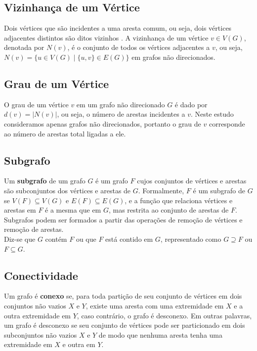 \subsection{Vizinhança de um Vértice}
Dois vértices que são incidentes a uma aresta comum, ou seja, dois vértices adjacentes distintos são ditos vizinhos \cite{Bondy2008}. A vizinhança de um vértice $v \in V(G)$, denotada por $N(v)$, é o conjunto de todos os vértices adjacentes a $v$, ou seja, $N(v) = \{ u \in V(G) \mid \{u, v\} \in E(G) \}$ em grafos não direcionados.

\subsection{Grau de um Vértice}
O grau de um vértice $v$ em um grafo não direcionado $G$ é dado por $d(v) = |N(v)|$, ou seja, o número de arestas incidentes a $v$. Neste estudo consideramos apenas grafos não direcionados, portanto o grau de $v$ corresponde ao número de arestas total ligadas a ele.

\subsection{Subgrafo}
Um \textbf{subgrafo} de um grafo $G$ é um grafo $F$ cujos conjuntos de vértices e arestas são subconjuntos dos vértices e arestas de $G$. Formalmente, $F$ é um subgrafo de $G$ se $V(F) \subseteq V(G)$ e $E(F) \subseteq E(G)$, e a função que relaciona vértices e arestas em $F$ é a mesma que em $G$, mas restrita ao conjunto de arestas de $F$. Subgrafos podem ser formados a partir das operações de remoção de vértices e remoção de arestas.\\
Diz-se que $G$ contém $F$ ou que $F$ está contido em $G$, representado como $G \supseteq F$ ou $F \subseteq G$.

\subsection{Conectividade}
Um grafo é \textbf{conexo} se, para toda partição de seu conjunto de vértices em dois conjuntos não vazios $X$ e $Y$, existe uma aresta com uma extremidade em $X$ e a outra extremidade em $Y$, caso contrário, o grafo é desconexo. Em outras palavras, um grafo é desconexo se seu conjunto de vértices pode ser particionado em dois subconjuntos não vazios $X$ e $Y$ de modo que nenhuma aresta tenha uma extremidade em $X$ e outra em $Y$.

